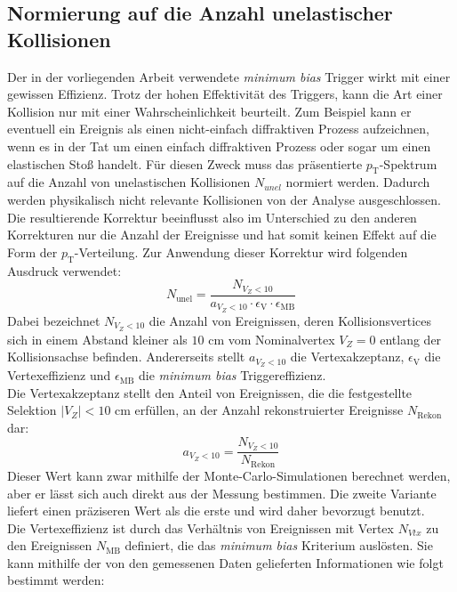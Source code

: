 \documentclass[12pt,a4paper]{report}
\begin{document}
\subsection{Normierung auf die Anzahl unelastischer Kollisionen}
Der in der vorliegenden Arbeit verwendete \textit{minimum bias} Trigger wirkt mit einer gewissen Effizienz. Trotz der hohen Effektivität des Triggers, kann die Art einer Kollision  nur mit einer Wahrscheinlichkeit beurteilt. Zum Beispiel kann er eventuell ein Ereignis als einen nicht-einfach diffraktiven Prozess aufzeichnen, wenn es in der Tat um einen einfach diffraktiven Prozess oder sogar um einen elastischen Stoß handelt. Für diesen Zweck muss das präsentierte $p_{\mathrm{T}}$-Spektrum auf die Anzahl von unelastischen Kollisionen $N_{unel}$ normiert werden. Dadurch werden physikalisch nicht relevante Kollisionen von der Analyse ausgeschlossen. Die resultierende Korrektur beeinflusst also im Unterschied zu den anderen Korrekturen nur die Anzahl der Ereignisse und hat somit keinen Effekt auf die Form der $p_{\mathrm{T}}$-Verteilung. Zur Anwendung dieser Korrektur wird folgenden Ausdruck verwendet:
\begin{equation}
\label{eq:Nunel}
	N_{\mathrm{unel}} = \dfrac{N_{V_{Z}<10}}{a_{V_{Z}<10} \cdot \epsilon_\mathrm{V} \cdot \epsilon_{\mathrm{MB}}}
\end{equation}
Dabei bezeichnet $N_{V_{Z}<10}$ die Anzahl von Ereignissen, deren Kollisionsvertices sich in einem Abstand kleiner als $10$ cm vom Nominalvertex $V_{Z} = 0$ entlang der Kollisionsachse befinden. Andererseits stellt $a_{V_{Z}<10}$ die Vertexakzeptanz, $\epsilon_\mathrm{V}$ die Vertexeffizienz und $\epsilon_{\mathrm{MB}}$ die \textit{minimum bias} Triggereffizienz.\\
Die Vertexakzeptanz stellt den Anteil von Ereignissen, die die festgestellte Selektion $|V_{Z}| < 10$ cm erfüllen, an der Anzahl rekonstruierter Ereignisse $N_{\mathrm{Rekon}}$ dar:
\begin{equation}
a_{V_{Z}<10} = \dfrac{N_{V_{Z}<10}}{N_{\mathrm{Rekon}}}
\end{equation}
Dieser Wert kann zwar mithilfe der Monte-Carlo-Simulationen berechnet werden, aber er lässt sich auch direkt aus der Messung bestimmen. Die zweite Variante liefert einen präziseren Wert als die erste und wird daher bevorzugt benutzt.\\
Die Vertexeffizienz ist durch das Verhältnis von Ereignissen mit Vertex $N_{Vtx}$ zu den Ereignissen $N_{\mathrm{MB}}$ definiert, die das \textit{minimum bias} Kriterium auslösten. Sie kann mithilfe der von den gemessenen Daten gelieferten Informationen wie folgt bestimmt werden:
\end{document}
